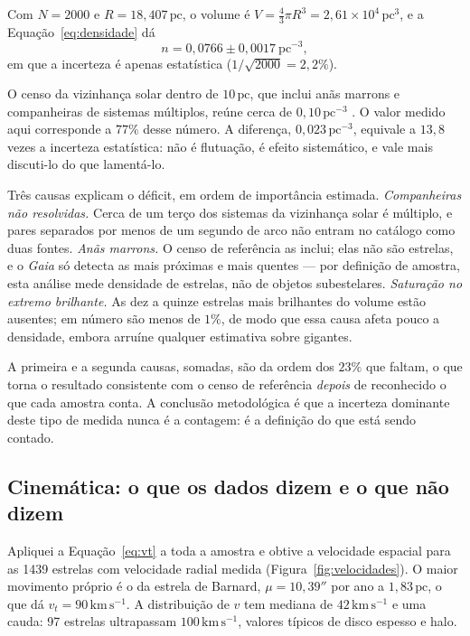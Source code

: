 \documentclass[10pt,a4paper,twocolumn]{article}
\begin{document}
Com $N=2000$ e $R=18{,}407\,\mathrm{pc}$, o volume é
$V=\tfrac{4}{3}\pi R^{3}=2{,}61\times10^{4}\,\mathrm{pc^{3}}$, e a
Equação~\eqref{eq:densidade} dá
\begin{equation}
    n = 0{,}0766 \pm 0{,}0017\ \mathrm{pc^{-3}} ,
    \label{eq:resultado}
\end{equation}
em que a incerteza é apenas estatística ($1/\sqrt{2000}=2{,}2\%$).

O censo da vizinhança solar dentro de $10\,\mathrm{pc}$, que inclui anãs
marrons e companheiras de sistemas múltiplos, reúne cerca de
$0{,}10\,\mathrm{pc^{-3}}$ \cite{recons,apostila}. O valor medido aqui
corresponde a $77\%$ desse número. A diferença, $0{,}023\,\mathrm{pc^{-3}}$,
equivale a $13{,}8$ vezes a incerteza estatística: não é flutuação, é
efeito sistemático, e vale mais discuti-lo do que lamentá-lo.

Três causas explicam o déficit, em ordem de importância estimada.
\emph{Companheiras não resolvidas.} Cerca de um terço dos sistemas da
vizinhança solar é múltiplo, e pares separados por menos de um segundo de
arco não entram no catálogo como duas fontes. \emph{Anãs marrons.} O censo
de referência as inclui; elas não são estrelas, e o \textit{Gaia} só
detecta as mais próximas e mais quentes --- por definição de amostra, esta
análise mede densidade de estrelas, não de objetos subestelares.
\emph{Saturação no extremo brilhante.} As dez a quinze estrelas mais
brilhantes do volume estão ausentes; em número são menos de $1\%$, de modo
que essa causa afeta pouco a densidade, embora arruíne qualquer estimativa
sobre gigantes.

A primeira e a segunda causas, somadas, são da ordem dos $23\%$ que
faltam, o que torna o resultado consistente com o censo de referência
\emph{depois} de reconhecido o que cada amostra conta. A conclusão
metodológica é que a incerteza dominante deste tipo de medida nunca é a
contagem: é a definição do que está sendo contado.

\subsection{Cinemática: o que os dados dizem e o que não dizem}

Apliquei a Equação~\eqref{eq:vt} a toda a amostra e obtive a velocidade
espacial para as 1439 estrelas com velocidade radial medida
(Figura~\ref{fig:velocidades}). O maior movimento próprio é o da estrela
de Barnard, $\mu=10{,}39''$ por ano a $1{,}83\,\mathrm{pc}$, o que dá
$v_t=90\,\mathrm{km\,s^{-1}}$. A distribuição de $v$ tem mediana de
$42\,\mathrm{km\,s^{-1}}$ e uma cauda: 97 estrelas ultrapassam
$100\,\mathrm{km\,s^{-1}}$, valores típicos de disco espesso e halo.
\end{document}
